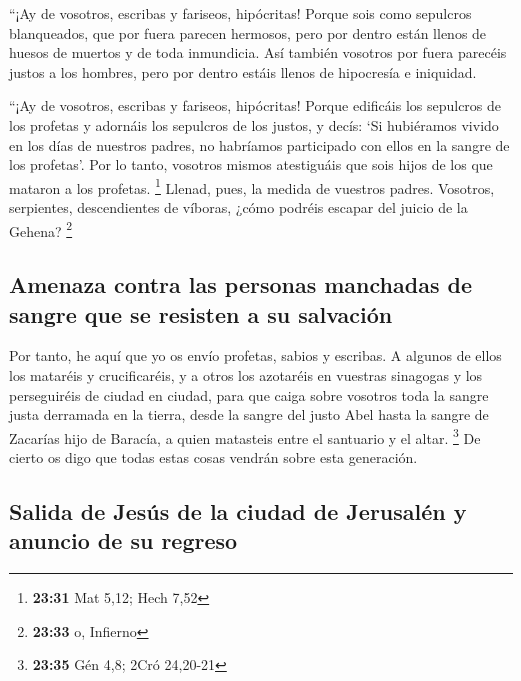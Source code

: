  ``¡Ay de vosotros, escribas y fariseos, hipócritas!
Porque sois como sepulcros blanqueados, que por fuera parecen hermosos,
pero por dentro están llenos de huesos de muertos y de toda inmundicia.
 Así también vosotros por fuera parecéis justos a los
hombres, pero por dentro estáis llenos de hipocresía e iniquidad.

 ``¡Ay de vosotros, escribas y fariseos, hipócritas!
Porque edificáis los sepulcros de los profetas y adornáis los sepulcros
de los justos,  y decís: `Si hubiéramos vivido en los
días de nuestros padres, no habríamos participado con ellos en la sangre
de los profetas'.  Por lo tanto, vosotros mismos
atestiguáis que sois hijos de los que mataron a los profetas.
\footnote{\textbf{23:31} Mat 5,12; Hech 7,52}  Llenad,
pues, la medida de vuestros padres.  Vosotros,
serpientes, descendientes de víboras, ¿cómo podréis escapar del juicio
de la Gehena? \footnote{\textbf{23:33} o, Infierno}

\hypertarget{amenaza-contra-las-personas-manchadas-de-sangre-que-se-resisten-a-su-salvaciuxf3n}{%
\subsection{Amenaza contra las personas manchadas de sangre que se
resisten a su
salvación}\label{amenaza-contra-las-personas-manchadas-de-sangre-que-se-resisten-a-su-salvaciuxf3n}}

 Por tanto, he aquí que yo os envío profetas, sabios y
escribas. A algunos de ellos los mataréis y crucificaréis, y a otros los
azotaréis en vuestras sinagogas y los perseguiréis de ciudad en ciudad,
 para que caiga sobre vosotros toda la sangre justa
derramada en la tierra, desde la sangre del justo Abel hasta la sangre
de Zacarías hijo de Baracía, a quien matasteis entre el santuario y el
altar. \footnote{\textbf{23:35} Gén 4,8; 2Cró 24,20-21} 
De cierto os digo que todas estas cosas vendrán sobre esta generación.

\hypertarget{salida-de-jesuxfas-de-la-ciudad-de-jerusaluxe9n-y-anuncio-de-su-regreso}{%
\subsection{Salida de Jesús de la ciudad de Jerusalén y anuncio de su
regreso}\label{salida-de-jesuxfas-de-la-ciudad-de-jerusaluxe9n-y-anuncio-de-su-regreso}}


